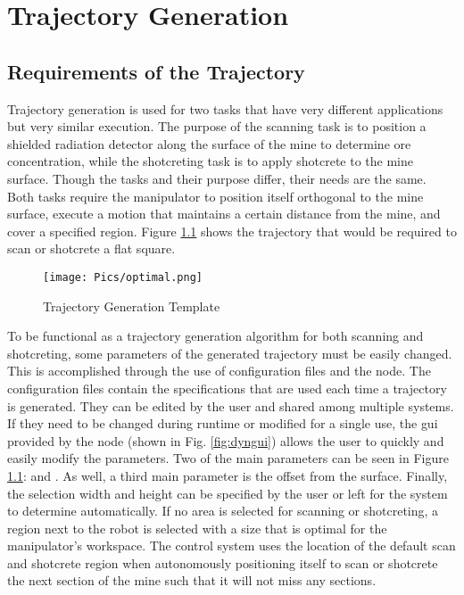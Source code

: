 \chapter{Trajectory Generation}
\label{chap:traj}

\section{Requirements of the Trajectory}
\label{sec:four}
Trajectory generation is used for two tasks that have very different applications but very similar execution. The purpose of the scanning task is to position a shielded radiation detector along the surface of the mine to determine ore concentration, while the shotcreting task is to apply shotcrete to the mine surface. Though the tasks and their purpose differ, their needs are the same. Both tasks require the manipulator to position itself orthogonal to the mine surface, execute a motion that maintains a certain distance from the mine, and cover a specified region. Figure \ref{fig:idealspray} shows the trajectory that would be required to scan or shotcrete a flat square.\\

\clearpage
\begin{figure}
    \centering
    \texttt{[image: Pics/optimal.png]}
    \caption{Trajectory Generation Template}
    \label{fig:idealspray}
\end{figure}
To be functional as a trajectory generation algorithm for both scanning and shotcreting, some parameters of the generated trajectory must be easily changed. This is accomplished through the use of configuration files and the  node. The configuration files contain the specifications that are used each time a trajectory is generated. They can be edited by the user and shared among multiple systems. If they need to be changed during runtime or modified for a single use, the \acrshort{gui} provided by the  node (shown in Fig. \ref{fig:dyngui}) allows the user to quickly and easily modify the parameters. Two of the main parameters can be seen in Figure \ref{fig:idealspray}:  and . As well, a third main parameter is the offset from the surface. Finally, the selection width and height can be specified by the user or left for the system to determine automatically. If no area is selected for scanning or shotcreting, a region next to the robot is selected with a size that is optimal for the manipulator's workspace. The control system uses the location of the default scan and shotcrete region when autonomously positioning itself to scan or shotcrete the next section of the mine such that it will not miss any sections.\\

